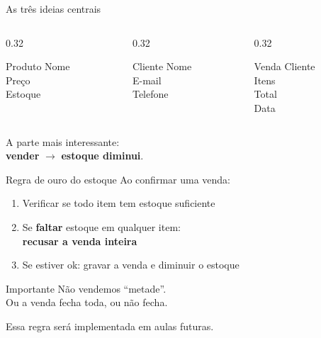 \documentclass[aspectratio=169,11pt]{beamer}
\begin{document}
\begin{frame}{As três ideias centrais}
  \begin{columns}[T]
    \begin{column}{0.32\textwidth}
      \begin{block}{Produto}
        Nome\\
        Preço\\
        Estoque
      \end{block}
    \end{column}
    \begin{column}{0.32\textwidth}
      \begin{block}{Cliente}
        Nome\\
        E-mail\\
        Telefone
      \end{block}
    \end{column}
    \begin{column}{0.32\textwidth}
      \begin{block}{Venda}
        Cliente\\
        Itens\\
        Total\\
        Data
      \end{block}
    \end{column}
  \end{columns}

  \vspace{0.9em}
  A parte mais interessante:\\
  \textbf{vender} $\rightarrow$ \textbf{estoque diminui}.
\end{frame}

\begin{frame}{Regra de ouro do estoque}
  Ao confirmar uma venda:

  \vspace{0.5em}
  \begin{enumerate}
    \item Verificar se todo item tem estoque suficiente
    \item Se \textbf{faltar} estoque em qualquer item:\\
          \textbf{recusar a venda inteira}
    \item Se estiver ok: gravar a venda e diminuir o estoque
  \end{enumerate}

  \vspace{0.7em}
  \begin{alertblock}{Importante}
    Não vendemos ``metade''.\\
    Ou a venda fecha toda, ou não fecha.
  \end{alertblock}

  Essa regra será implementada em aulas futuras.
\end{frame}
\end{document}
